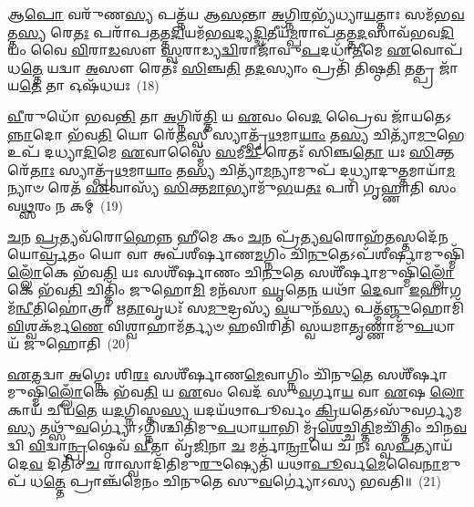 {\anuvakamend[{\-\ul{𑌯𑍁}\-\-\ul{𑌞𑍍𑌜𑌾}\-𑌨𑍇𑌷𑍍𑌵𑌗𑍍𑌨𑍇॑ \ul{𑌪𑍍𑌰𑌾}\-𑌚𑍀𑌨᳴𑌮𑍁\-\ul{𑌤𑍍𑌤𑌾}\-𑌨𑌂 𑌵𑌾᳴\-\ul{𑌮}\-𑌭𑍃\-\ul{𑌤}\-𑌞𑍍𑌚𑌤𑍁᳴𑌰𑍍𑌵𑌿𑍞𑌶𑌤𑌿𑌶𑍍𑌚}]}%

𑌆\-\ul{𑌪𑍋} 𑌵𑌰𑍁᳴𑌣\-\ul{𑌸𑍍𑌯} 𑌪𑌤𑍍𑌨᳴𑌯 𑌆\-\ul{𑌸}\-𑌨𑍍𑌤𑌾 \ul{𑌅}\-𑌗𑍍𑌨𑌿\-\ul{𑌰}\-𑌭𑍍𑌯᳴𑌧𑍍𑌯𑌾\-\ul{𑌯}\-𑌤𑍍𑌤𑌾𑌃 𑌸𑌮᳴𑌭\-\ul{𑌵}\-𑌤𑍍𑌤\-\ul{𑌸𑍍𑌯} 𑌰𑍇\-\ul{𑌤𑌃} 𑌪𑌰𑌾᳴𑌪\-\ul{𑌤}\-𑌤𑍍𑌤\-\ul{𑌦𑌿}\-𑌯𑌮᳴𑌭\-\ul{𑌵}\-𑌦𑍍𑌯\-\ul{𑌦𑍍𑌦𑍍𑌵𑌿}\-𑌤𑍀𑌯᳴\-\ul{𑌮𑍍𑌪}\-𑌰𑌾𑌪᳴\-\ul{𑌤}\-𑌤𑍍𑌤\-\ul{𑌦}\-𑌸𑌾\-𑌵᳴𑌭𑌵\-\ul{𑌦𑌿}\-𑌯𑌂 𑌵𑍈 \ul{𑌵𑌿}\-𑌰𑌾\-\ul{𑌡}\-𑌸𑍗 \ul{𑌸𑍍𑌵}\-𑌰𑌾𑌡𑍍𑌯\-\ul{𑌦𑍍𑌵𑌿}\-𑌰𑌾𑌜𑌾᳴𑌵𑍁\-\ul{𑌪}\-𑌦𑌧𑌾᳴\-\ul{𑌤𑍀}\-𑌮𑍇 \ul{𑌏}\-𑌵𑍋𑌪᳴ 𑌧\-\ul{𑌤𑍍𑌤𑍇} 𑌯𑌦𑍍𑌵𑌾 \ul{𑌅}\-𑌸𑍗 𑌰𑍇𑌤𑌃᳴ \ul{𑌸𑌿}\-𑌞𑍍𑌚\-\ul{𑌤𑌿} 𑌤\-\ul{𑌦}\-𑌸𑍍𑌯𑌾𑌂 𑌪𑍍𑌰𑌤𑌿᳴ 𑌤𑌿𑌷𑍍𑌠\-\ul{𑌤𑌿} 𑌤𑌤𑍍𑌪𑍍𑌰 𑌜𑌾᳴𑌯\-\ul{𑌤𑍇} 𑌤𑌾 𑌓𑌷᳴𑌧𑌯𑌃~(18)

\-\ul{𑌵𑍀}\-𑌰𑍁𑌧𑍋᳴ 𑌭𑌵\-\ul{𑌨𑍍𑌤𑌿} 𑌤𑌾 \ul{𑌅}\-𑌗𑍍𑌨𑌿𑌰᳴\-\ul{𑌤𑍍𑌤𑌿} 𑌯 \ul{𑌏}\-𑌵𑌂 𑌵𑍇\-\ul{𑌦} 𑌪𑍍𑌰𑍈𑌵 𑌜𑌾᳴𑌯𑌤𑍇\-𑌽\-\ul{𑌨𑍍𑌨𑌾}\-𑌦𑍋 𑌭᳴𑌵\-\ul{𑌤𑌿} 𑌯𑍋 𑌰𑍇᳴\-\ul{𑌤}\-𑌸𑍍𑌵𑍀 𑌸𑍍𑌯𑌾𑌤𑍍𑌪𑍍𑌰᳴\-\ul{𑌥}\-𑌮𑌾\-\ul{𑌯𑌾𑌂} 𑌤\-\ul{𑌸𑍍𑌯} 𑌚𑌿𑌤𑍍𑌯𑌾᳴\-\ul{𑌮𑍁}\-𑌭𑍇 𑌉𑌪᳴ 𑌦𑌧𑍍𑌯𑌾\-\ul{𑌦𑌿}\-𑌮𑍇 \ul{𑌏}\-𑌵𑌾𑌸𑍍𑌮𑍈᳴ \ul{𑌸}\-𑌮𑍀\-\ul{𑌚𑍀} 𑌰𑍇𑌤𑌃᳴ 𑌸𑌿𑌞𑍍𑌚\-\ul{𑌤𑍋} 𑌯𑌃 \ul{𑌸𑌿}\-𑌕𑍍𑌤𑌰𑍇᳴\-\ul{𑌤𑌾𑌃} 𑌸𑍍𑌯𑌾𑌤𑍍𑌪𑍍𑌰᳴\-\ul{𑌥}\-𑌮𑌾\-\ul{𑌯𑌾𑌂} 𑌤\-\ul{𑌸𑍍𑌯} 𑌚𑌿𑌤𑍍𑌯𑌾᳴\-\ul{𑌮}\-𑌨𑍍𑌯𑌾𑌮𑍁𑌪᳴ 𑌦𑌧𑍍𑌯𑌾𑌦𑍁\-\ul{𑌤𑍍𑌤}\-𑌮𑌾𑌯𑌾᳴\-\-\ul{𑌮}\-𑌨𑍍𑌯𑌾𑍞 𑌰𑍇𑌤᳴ \ul{𑌏}\-𑌵𑌾𑌸𑍍𑌯᳴ \ul{𑌸𑌿}\-𑌕𑍍𑌤\-\ul{𑌮𑌾}\-𑌭𑍍𑌯𑌾𑌮𑍁᳴\-\ul{𑌭}\-𑌯\-\ul{𑌤𑌃} 𑌪𑌰𑌿᳴ 𑌗𑍃𑌹𑍍𑌣𑌾𑌤𑌿 𑌸𑌂𑌵\-\ul{𑌥𑍍𑌸}\-𑌰𑌂 𑌨 𑌕𑌮𑍍~(19)

\-\ul{𑌚}\-𑌨 \ul{𑌪𑍍𑌰}\-𑌤𑍍𑌯𑌵᳴𑌰𑍋\-\ul{𑌹𑍇}\-𑌨𑍍𑌨 𑌹𑍀𑌮𑍇 𑌕𑌂 \ul{𑌚}\-𑌨 𑌪𑍍𑌰᳴𑌤𑍍𑌯\-\ul{𑌵}\-𑌰𑍋𑌹᳴\-\ul{𑌤}\-𑌸𑍍𑌤𑌦𑍇᳴𑌨𑌯𑍋\-\ul{𑌰𑍍𑌵𑍍𑌰}\-𑌤𑌂 𑌯𑍋 𑌵𑌾 𑌅𑌪᳴𑌶𑍀𑌰𑍍\mbox{}𑌷𑌾𑌣\-\ul{𑌮}\-𑌗𑍍𑌨𑌿𑌂 𑌚𑌿᳴\-\ul{𑌨𑍁}\-𑌤𑍇\-𑌽𑌪᳴𑌶𑍀𑌰𑍍\mbox{}\-\ul{𑌷𑌾}\-𑌮𑍁𑌷𑍍𑌮𑌿᳴\-\ul{𑌲𑍍𑌲𑍋𑌁}\-𑌕𑍇 𑌭᳴𑌵\-\ul{𑌤𑌿} 𑌯𑌃 𑌸𑌶𑍀᳴𑌰𑍍\mbox{}𑌷𑌾𑌣𑌂 𑌚𑌿\-\ul{𑌨𑍁}\-𑌤𑍇 𑌸𑌶𑍀᳴𑌰𑍍\mbox{}\-\ul{𑌷𑌾}\-𑌮𑍁𑌷𑍍𑌮𑌿᳴\-\ul{𑌲𑍍𑌲𑍋𑌁}\-𑌕𑍇 𑌭᳴𑌵\-\ul{𑌤𑌿} 𑌚𑌿𑌤𑍍𑌤𑌿𑌂᳴ 𑌜𑍁𑌹𑍋\-\ul{𑌮𑌿} 𑌮𑌨᳴𑌸𑌾 \ul{𑌘𑍃}\-𑌤𑍇\-\ul{𑌨} 𑌯𑌥𑌾᳴ \ul{𑌦𑍇}\-𑌵𑌾 \ul{𑌇}\-𑌹𑌾𑌗𑌮᳴\-\ul{𑌨𑍍𑌵𑍀}\-𑌤𑌿𑌹𑍋॑𑌤𑍍𑌰𑌾 𑌋\-\ul{𑌤𑌾}\-𑌵𑍃𑌧𑌃᳴ 𑌸\-\ul{𑌮𑍁}\-𑌦𑍍𑌰𑌸𑍍𑌯᳴ \ul{𑌵}\-𑌯𑍁𑌨᳴\-\ul{𑌸𑍍𑌯} 𑌪𑌤𑍍𑌮᳴\-\ul{𑌞𑍍𑌜𑍁}\-𑌹𑍋𑌮𑌿᳴ \ul{𑌵𑌿}\-𑌶𑍍𑌵𑌕᳴𑌰𑍍𑌮\-\ul{𑌣𑍇} 𑌵𑌿𑌶𑍍𑌵𑌾𑌹𑌾𑌮᳴𑌰𑍍𑌤𑍍𑌯𑍞 \ul{𑌹}\-𑌵𑌿𑌰𑌿𑌤𑌿᳴ 𑌸𑍍𑌵𑌯𑌮𑌾\-\ul{𑌤𑍃}\-𑌣𑍍𑌣𑌾𑌮𑍁᳴\-\ul{𑌪}\-𑌧𑌾𑌯᳴ 𑌜𑍁𑌹𑍋𑌤𑌿~(20)

\-\ul{𑌏}\-𑌤𑌦𑍍𑌵𑌾 \ul{𑌅}\-𑌗𑍍𑌨𑍇𑌃 𑌶𑌿\-\ul{𑌰𑌃} 𑌸𑌶𑍀᳴𑌰𑍍\mbox{}𑌷𑌾𑌣\-\ul{𑌮𑍇}\-𑌵𑌾𑌗𑍍𑌨𑌿𑌂 𑌚𑌿᳴𑌨𑍁\-\ul{𑌤𑍇} 𑌸𑌶𑍀᳴𑌰𑍍\mbox{}\-\ul{𑌷𑌾}\-𑌮𑍁𑌷𑍍𑌮𑌿᳴\-\ul{𑌲𑍍𑌲𑍋𑌁}\-𑌕𑍇 𑌭᳴𑌵\-\ul{𑌤𑌿} 𑌯 \ul{𑌏}\-𑌵𑌂 𑌵𑍇𑌦᳴ 𑌸𑍁\-\ul{𑌵}\-𑌰𑍍𑌗𑌾\-\ul{𑌯} 𑌵𑌾 \ul{𑌏}\-𑌷 \ul{𑌲𑍋}\-𑌕𑌾𑌯᳴ 𑌚𑍀𑌯\-\ul{𑌤𑍇} 𑌯\-\ul{𑌦}\-𑌗𑍍𑌨𑌿𑌸𑍍𑌤\-\ul{𑌸𑍍𑌯} 𑌯𑌦𑌯᳴𑌥𑌾𑌪𑍂𑌰𑍍𑌵𑌂 \ul{𑌕𑍍𑌰𑌿}\-𑌯𑌤𑍇\-𑌽𑌸𑍁᳴𑌵𑌰𑍍𑌗𑍍𑌯𑌮\-\ul{𑌸𑍍𑌯} 𑌤𑌥𑍍𑌸𑍁᳴\-\ul{𑌵}\-𑌰𑍍𑌗𑍍𑌯𑍋॑\-𑌽𑌗𑍍𑌨𑌿𑌶𑍍𑌚𑌿𑌤𑌿᳴𑌮𑍁\-\ul{𑌪}\-𑌧𑌾\-\ul{𑌯𑌾}\-𑌭𑌿 𑌮𑍃᳴\-\ul{𑌶𑍇}\-𑌚𑍍𑌚𑌿\-\ul{𑌤𑍍𑌤𑌿}\-𑌮𑌚𑌿᳴𑌤𑍍𑌤𑌿𑌂 𑌚𑌿𑌨\-\ul{𑌵}\-𑌦𑍍𑌵𑌿 \ul{𑌵𑌿}\-𑌦𑍍𑌵𑌾\-\ul{𑌨𑍍𑌪𑍃}\-𑌷𑍍𑌠𑍇𑌵᳴ \ul{𑌵𑍀}\-𑌤𑌾 𑌵𑍃᳴\-\ul{𑌜𑌿}\-𑌨𑌾 \ul{𑌚} 𑌮𑌰𑍍𑌤𑌾॑\-\ul{𑌨𑍍𑌰𑌾}\-𑌯𑍇 𑌚᳴ 𑌨𑌃 𑌸𑍍𑌵\-\ul{𑌪}\-𑌤𑍍𑌯𑌾𑌯᳴ 𑌦𑍇\-\ul{𑌵} 𑌦𑌿𑌤𑌿𑌂᳴ \ul{𑌚} 𑌰𑌾𑌸𑍍𑌵𑌾𑌦𑌿᳴𑌤𑌿𑌮𑍁\-\ul{𑌰𑍁}\-𑌷𑍍𑌯𑍇𑌤𑌿᳴ 𑌯𑌥𑌾\-\ul{𑌪𑍂}\-𑌰𑍍𑌵\-\ul{𑌮𑍇}\-𑌵𑍈\-\ul{𑌨𑌾}\-𑌮𑍁𑌪᳴ 𑌧\-\ul{𑌤𑍍𑌤𑍇} 𑌪𑍍𑌰𑌾𑌞𑍍𑌚᳴𑌮𑍇𑌨𑌂 𑌚𑌿𑌨𑍁𑌤𑍇 𑌸𑍁\-\ul{𑌵}\-𑌰𑍍𑌗𑍍𑌯𑍋॑\-𑌽𑌸𑍍𑌯 𑌭𑌵𑌤𑌿॥~(21)

